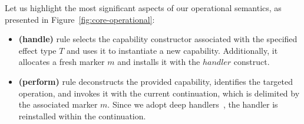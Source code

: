 \documentclass[acmsmall]{acmart}
\begin{document}

Let us highlight the most significant aspects of our operational semantics, as presented in Figure~\ref{fig:core-operational}:
\begin{itemize}
    \item \textbf{(handle)} rule selects the capability constructor associated with the specified effect type $T$ and uses it to instantiate a new capability.
    Additionally, it allocates a fresh marker $m$ and installs it with the $handler$ construct.
    \item \textbf{(perform)} rule deconstructs the provided capability, identifies the targeted operation, and invokes it with the current continuation, which is delimited by the associated marker $m$.
    Since we adopt deep handlers~\cite{hillerstrom2018shallow}, the handler is reinstalled within the continuation.
\end{itemize}
\end{document}
